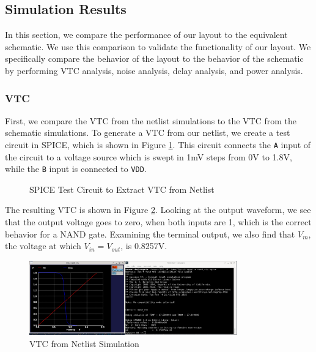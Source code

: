 \documentclass{article}
\begin{document}
	\subsection{Simulation Results}
	
	In this section, we compare the performance of our layout to the equivalent schematic. We use this comparison to validate the functionality of our layout. We specifically compare the behavior of the layout to the behavior of the schematic by performing VTC analysis, noise analysis, delay analysis, and power analysis.
	
	\subsubsection{VTC}
	
	First, we compare the VTC from the netlist simulations to the VTC from the schematic simulations. To generate a VTC from our netlist, we create a test circuit in SPICE, which is shown in Figure \ref{fig::nand_vtc_test_circuit}. This circuit connects the \texttt{A} input of the circuit to a voltage source which is swept in 1mV steps from 0V to 1.8V, while the \texttt{B} input is connected to \texttt{VDD}.
	
	\begin{figure}[H]
		
		\caption{SPICE Test Circuit to Extract VTC from Netlist}
		\label{fig::nand_vtc_test_circuit}
	\end{figure}
	
	The resulting VTC is shown in Figure \ref{fig::nand_vtc}. Looking at the output waveform, we see that the output voltage goes to zero, when both inputs are 1, which is the correct behavior for a NAND gate. Examining the terminal output, we also find that $V_m$, the voltage at which $V_{in} = V_{out}$, is 0.8257V.
	
	\begin{figure}[H]
		\centerline{\includegraphics[width=0.8\textwidth]{nand_vtc.png}}
		\caption{VTC from Netlist Simulation}
		\label{fig::nand_vtc}
	\end{figure}
	
\end{document}
